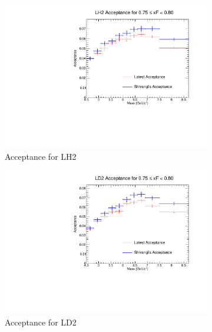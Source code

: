 \documentclass[11pt]{article}
\begin{document}
\begin{figure}[p]
    \centering
    \begin{subfigure}[b]{0.48\textwidth}
       \includegraphics[width=\linewidth]{./acceptancePlots/LH2_acceptance_xF_bin_15.pdf}
       \caption{Acceptance for LH2}
    \end{subfigure}\hfill
    \begin{subfigure}[b]{0.48\textwidth}
       \includegraphics[width=\linewidth]{./acceptancePlots/LD2_acceptance_xF_bin_15.pdf}
       \caption{Acceptance for LD2}
    \end{subfigure}
    \begin{subfigure}[b]{0.48\textwidth}

\end{subfigure}
\end{figure}
\end{document}
